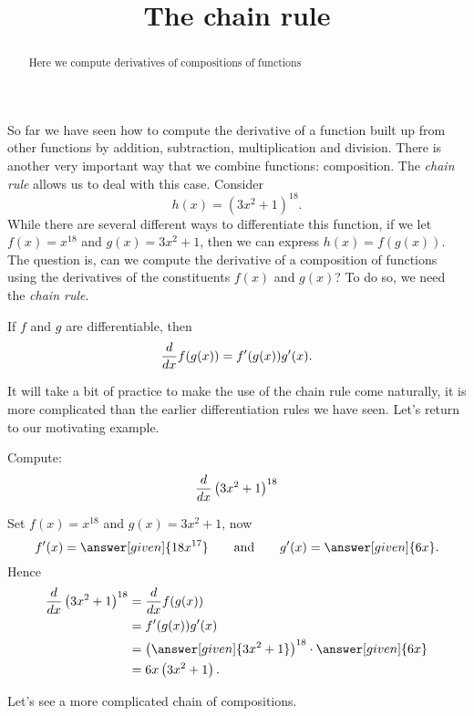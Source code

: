 \documentclass{ximera}
\title[Dig-In:]{The chain rule}
\begin{document}
\begin{abstract}
  Here we compute derivatives of compositions of functions
\end{abstract}
\maketitle


So far we have seen how to compute the derivative of a function built
up from other functions by addition, subtraction, multiplication and
division. There is another very important way that we combine
functions: composition. The \textit{chain rule} allows us to deal with
this case. Consider
\[
h(x) = \left(3x^2+1\right)^{18}.
\] 
While there are several different ways to differentiate this function,
if we let $f(x) = x^{18}$ and $g(x) = 3x^2+1$, then we can express
$h(x) = f(g(x))$. The question is, can we compute the derivative of a
composition of functions using the derivatives of the constituents
$f(x)$ and $g(x)$? To do so, we need the \textit{chain rule}.



\begin{theorem}
If $f$ and $g$ are differentiable, then
\[
\frac{d}{\mathop{}\!d x} f(g(x)) = f'(g(x))g'(x).
\]
\end{theorem}



It will take a bit of practice to make the use of the chain rule come
naturally, it is more complicated than the earlier differentiation
rules we have seen. Let's return to our motivating example.

\begin{example}
Compute:
\[
\frac{d}{\mathop{}\!d x} \left(3x^2+1\right)^{18}
\]

\begin{explanation}
Set $f(x) = x^{18}$ and $g(x) = 3x^2+1$, now
\[
f'(x) = \answer[given]{18x^{17}} \qquad\text{and}\qquad g'(x) = \answer[given]{6x}.
\]
Hence
\begin{align*}
\ddx \left(3x^2+1\right)^{18} &= \ddx f(g(x))\\ 
&=f'(g(x))g'(x) \\
&= \left(\answer[given]{3x^2+1}\right)^{18}\cdot \answer[given]{6x}\\
&= 6x\left(3x^2+1\right).
\end{align*}
\end{explanation}
\end{example}


Let's see a more complicated chain of compositions.
\end{document}
